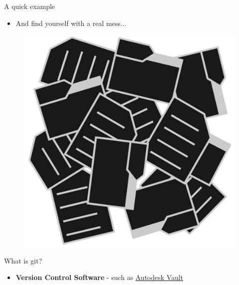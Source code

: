 \begin{frame}{A quick example}
\begin{itemize}
    \item And find yourself with a real mess...
\end{itemize}

\begin{figure}
    \centering
    \includegraphics[width=0.35\linewidth]{assets/pure_chaos_nobg.png}
    \label{fig:pure_chaos}
\end{figure}

\end{frame}

\begin{frame}{What is git?}
\begin{itemize}
    \item \textbf{Version Control Software} - such as \href{https://help.autodesk.com/view/VAULT/2023/ENU/?guid=GUID-87D9CA09-9881-4506-9465-0677392BCD7E}{Autodesk Vault}
    \end{itemize}
    
\end{frame}

